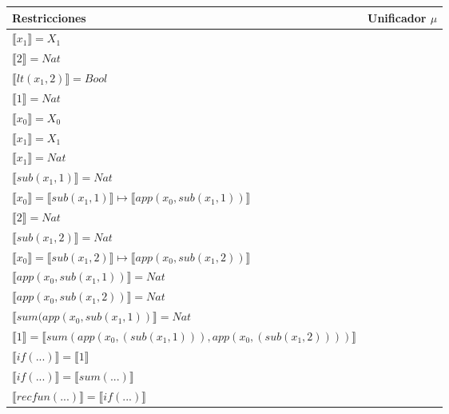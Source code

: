 \begin{exercise}
\begin{description}
                \begin{center}
                    \begin{longtable}[!h]{ | l | l | } 
                      \hline
                      Restricciones & Unificador $\mu$ \\ 
                        \hline
                        $ \llbracket x_1 \rrbracket = X_1$ & \\
                        $ \llbracket 2 \rrbracket = Nat$  & \\
                        $ \llbracket lt(x_1 , 2) \rrbracket = Bool$ & \\
                        $ \llbracket 1 \rrbracket = Nat$ & \\
                        $ \llbracket x_0 \rrbracket = X_0$ & \\
                        $ \llbracket x_1 \rrbracket = X_1$ & \\
                        $ \llbracket x_1 \rrbracket = Nat$ & \\
                        $ \llbracket sub(x_1,1) \rrbracket = Nat$ & \\
                        $ \llbracket x_0 \rrbracket =  \llbracket sub(x_1,1) \rrbracket \mapsto  \llbracket app(x_0, sub(x_1,1)) \rrbracket$ & \\
                        $ \llbracket 2 \rrbracket = Nat$ & \\
                        $ \llbracket sub(x_1,2) \rrbracket = Nat$ & \\
                        $ \llbracket x_0 \rrbracket =  \llbracket sub(x_1,2) \rrbracket \mapsto  \llbracket app(x_0, sub(x_1,2)) \rrbracket$ & \\
                        $ \llbracket app(x_0, sub(x_1,1)) \rrbracket = Nat$ & \\
                        $ \llbracket app(x_0, sub(x_1,2)) \rrbracket = Nat$ & \\
                        $ \llbracket sum(app(x_0, sub(x_1,1)) \rrbracket = Nat$ & \\
                        $ \llbracket 1 \rrbracket =  \llbracket sum(app(x_0, (sub(x_1,1))), app(x_0, (sub(x_1,2)))) \rrbracket$ & \\
                        $ \llbracket if(...) \rrbracket =  \llbracket 1 \rrbracket$ & \\
                        $ \llbracket if(...) \rrbracket =  \llbracket sum(...) \rrbracket$ & \\
                        $ \llbracket recfun(...) \rrbracket =  \llbracket if(...) \rrbracket$ & \\

\end{longtable}
\end{center}
\end{description}
\end{exercise}
